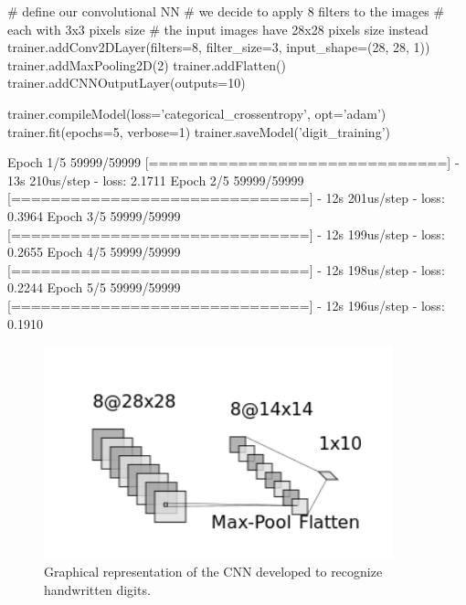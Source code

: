 \begin{ipython}
# define our convolutional NN
# we decide to apply 8 filters to the images
# each with 3x3 pixels size
# the input images have 28x28 pixels size instead
trainer.addConv2DLayer(filters=8, filter_size=3, input_shape=(28, 28, 1))
trainer.addMaxPooling2D(2)
trainer.addFlatten()
trainer.addCNNOutputLayer(outputs=10)

trainer.compileModel(loss='categorical_crossentropy', opt='adam')
trainer.fit(epochs=5, verbose=1)
trainer.saveModel('digit_training')
\end{ipython}
\begin{ioutput}
Epoch 1/5
59999/59999 [==============================] - 13s 210us/step - loss: 2.1711
Epoch 2/5
59999/59999 [==============================] - 12s 201us/step - loss: 0.3964
Epoch 3/5
59999/59999 [==============================] - 12s 199us/step - loss: 0.2655
Epoch 4/5
59999/59999 [==============================] - 12s 198us/step - loss: 0.2244
Epoch 5/5
59999/59999 [==============================] - 12s 196us/step - loss: 0.1910
\end{ioutput}

\begin{figure}[htb]
	\centering
	\includegraphics[width=0.9\textwidth]{figures/cnn_2d.png}
	\caption{Graphical representation of the CNN developed to recognize handwritten digits.}
        \label{fig:cnn2d}
\end{figure}

